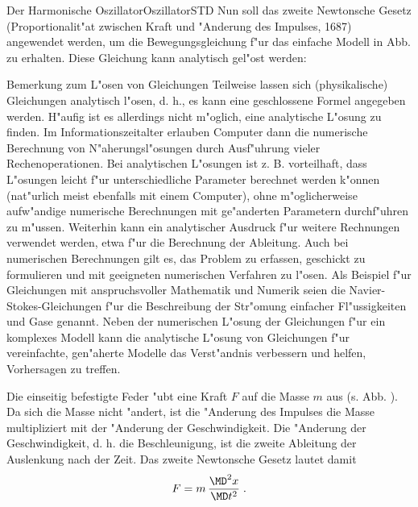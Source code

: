 \begin{MXContent}{Der Harmonische Oszillator}{Oszillator}{STD}%
Nun soll das zweite Newtonsche Gesetz (Proportionalit"at zwischen Kraft und "Anderung des Impulses, 1687) angewendet werden, um die Bewegungsgleichung f"ur das einfache Modell in Abb.  zu erhalten. Diese Gleichung kann analytisch gel"ost werden:

  \begin{MHint}{Bemerkung zum L"osen von Gleichungen}
  Teilweise lassen sich (physikalische) Gleichungen analytisch l"osen, d. h., es kann eine geschlossene Formel angegeben werden. H"aufig ist es allerdings nicht m"oglich, eine analytische L"osung zu finden. Im Informationszeitalter erlauben Computer dann die numerische Berechnung von N"aherungsl"osungen durch Ausf"uhrung vieler Rechenoperationen. Bei analytischen L"osungen ist z. B. vorteilhaft, dass L"osungen leicht f"ur unterschiedliche Parameter berechnet werden k"onnen (nat"urlich meist ebenfalls mit einem Computer), ohne m"oglicherweise aufw"andige numerische Berechnungen mit ge"anderten Parametern durchf"uhren zu m"ussen. Weiterhin kann ein analytischer Ausdruck f"ur weitere Rechnungen verwendet werden, etwa f"ur die Berechnung der Ableitung. Auch bei numerischen Berechnungen gilt es, das Problem zu erfassen, geschickt zu formulieren und mit geeigneten numerischen Verfahren zu l"osen. Als Beispiel f"ur Gleichungen mit anspruchsvoller Mathematik und Numerik seien die Navier-Stokes-Gleichungen f"ur die Beschreibung der Str"omung einfacher Fl"ussigkeiten und Gase genannt. Neben der numerischen L"osung der Gleichungen f"ur ein komplexes Modell kann die analytische L"osung von Gleichungen f"ur vereinfachte, gen"aherte Modelle das Verst"andnis verbessern und helfen, Vorhersagen zu treffen.
  \end{MHint}

Die einseitig befestigte Feder "ubt eine Kraft $F$ auf die Masse $m$ aus (s. Abb. ). Da sich die Masse nicht "andert, ist die "Anderung des Impulses die Masse multipliziert mit der "Anderung der Geschwindigkeit. Die "Anderung der Geschwindigkeit, d. h. die Beschleunigung, ist die zweite Ableitung der Auslenkung nach der Zeit. Das zweite Newtonsche Gesetz lautet damit
\begin{equation}
  F = m\, \frac{\MD^2 x }{\MD t^2}\;.
\end{equation}


\end{MXContent}
